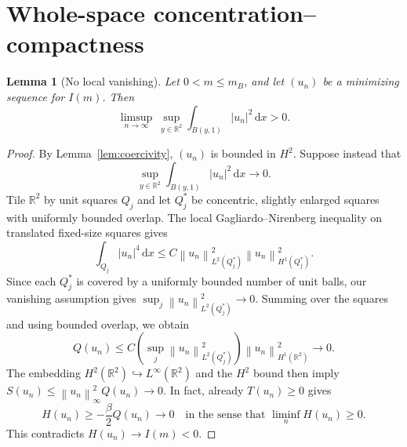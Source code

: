 \documentclass[11pt]{article}
\numberwithin{equation}{section}
\newtheorem{lemma}[theorem]{Lemma}
\theoremstyle{remark}
\newcommand{\R}{\mathbb{R}}
\newcommand{\dd}{\,\mathrm{d}}
\newcommand{\norm}[1]{\left\lVert #1\right\rVert}
\newcommand{\abs}[1]{\left\lvert #1\right\rvert}
\begin{document}
\section{Whole-space concentration--compactness}
\label{sec:compactness}

\begin{lemma}[No local vanishing]\label{lem:nonvanishing}
Let $0<m\le m_B$, and let $(u_n)$ be a minimizing sequence for $I(m)$.
Then
\begin{equation}\label{eq:notvanish}
\limsup_{n\to\infty}\ \sup_{y\in\R^2}
\int_{B(y,1)}\abs{u_n}^2\dd x>0.
\end{equation}
\end{lemma}
\begin{proof}
By Lemma~\ref{lem:coercivity}, $(u_n)$ is bounded in $H^2$.
Suppose instead that
\[
\sup_{y\in\R^2}\int_{B(y,1)}\abs{u_n}^2\dd x\to0.
\]
Tile $\R^2$ by unit squares $Q_j$ and let $Q_j^*$ be concentric, slightly
enlarged squares with uniformly bounded overlap.  The local
Gagliardo--Nirenberg inequality on translated fixed-size squares gives
\[
\int_{Q_j}\abs{u_n}^4\dd x
\le C\norm{u_n}_{L^2(Q_j^*)}^2
\norm{u_n}_{H^1(Q_j^*)}^2.
\]
Since each $Q_j^*$ is covered by a uniformly bounded number of unit balls,
our vanishing assumption gives
$\sup_j\norm{u_n}_{L^2(Q_j^*)}^2\to0$.
Summing over the squares and using bounded overlap, we obtain
\begin{equation}\label{eq:Qvanishing}
Q(u_n)\le C
\left(\sup_j\norm{u_n}_{L^2(Q_j^*)}^2\right)
\norm{u_n}_{H^1(\R^2)}^2\longrightarrow0.
\end{equation}
The embedding $H^2(\R^2)\hookrightarrow L^\infty(\R^2)$ and the
$H^2$ bound then imply
$S(u_n)\le\norm{u_n}_\infty^2 Q(u_n)\to0$.
In fact, already $T(u_n)\ge0$ gives
\[
H(u_n)\ge-\frac{\beta}{2}Q(u_n)\longrightarrow0
\quad\text{in the sense that }\liminf_n H(u_n)\ge0.
\]
This contradicts $H(u_n)\to I(m)<0$.
\end{proof}
\end{document}
